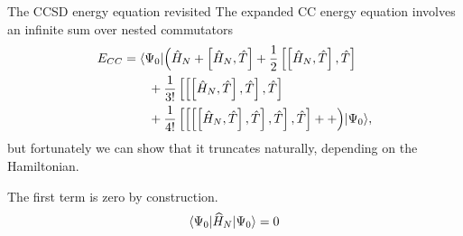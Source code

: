 \begin{frame}{The CCSD energy equation revisited}
        The expanded CC energy equation involves an infinite sum over nested commutators
        \begin{align*}
            E_{CC} &= \langle\Psi_0|\Bigl( \hat{H}_N + \left[ \hat{H}_N, \hat{T} \right] +
                \frac{1}{2} \left[\left[ \hat{H}_N, \hat{T} \right], \hat{T}\right] \\
                & \qquad + \frac{1}{3!} \left[ \left[\left[ \hat{H}_N, \hat{T} \right], \hat{T}\right], \hat{T} \right] \\
                & \qquad + \frac{1}{4!} \left[ \left[ \left[\left[ \hat{H}_N, \hat{T} \right], \hat{T}\right], \hat{T} \right], \hat{T} \right] ++ \Bigr) |\Psi_0\rangle, \\
        \end{align*}
        but fortunately we can show that it truncates naturally, depending on the Hamiltonian.
        
    \begin{block}{}
        The first term is zero by construction.
        \begin{equation*}
            \langle\Psi_0| \widehat{H}_N |\Psi_0\rangle = 0
        \end{equation*}       
    \end{block}
\end{frame}

    
